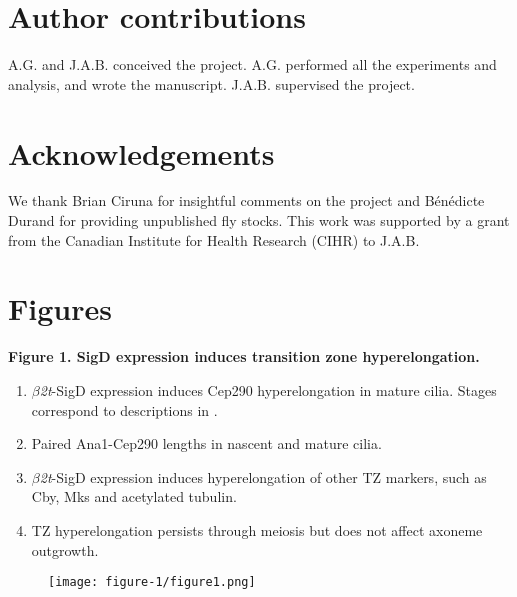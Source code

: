 \documentclass[12pt, twoside, letterpaper]{article}
\newcommand{\sigd}{$\beta$\textit{2t}-SigD}
\begin{document}
\section{Author contributions}
A.G. and J.A.B. conceived the project.
A.G. performed all the experiments and analysis, and wrote the manuscript.
J.A.B. supervised the project.


\section{Acknowledgements}
We thank Brian Ciruna for insightful comments on the project
and Bénédicte Durand for providing unpublished fly stocks.
This work was supported by a grant from the Canadian Institute for Health Research
(CIHR) to J.A.B.




\newpage
\section{Figures}

%
\textbf{Figure 1. SigD expression induces transition zone hyperelongation.}
\begin{enumerate}[label={(\Alph*)}, nolistsep]
\item \sigd{} expression induces Cep290 hyperelongation in mature cilia.
  Stages correspond to descriptions in \citep{cenci1994chromatin}.
\item Paired Ana1-Cep290 lengths in nascent and mature cilia.
\item \sigd{} expression induces hyperelongation of other TZ markers, such as Cby, Mks
  and acetylated tubulin.
\item TZ hyperelongation persists through meiosis but does not affect
  axoneme outgrowth.
\end{enumerate}

\begin{figure}[ht]
  \texttt{[image: figure-1/figure1.png]}
\end{figure}
\newpage
\end{document}
